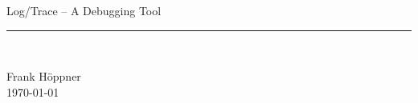 \documentclass[a4paper]{book}
\begin{document}
\thispagestyle{empty}

\begin{center}
{\Large Log/Trace -- A Debugging Tool\\[-3mm]
\rule{12cm}{1mm}\\[1cm]
}
{Frank H\"oppner}\\
{\today}\\
\end{center}

\clearemptydoublepage
{}
\tableofcontents
\clearemptydoublepage
{}
\end{document}
